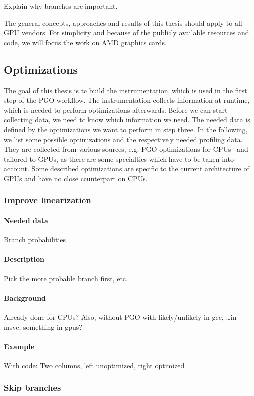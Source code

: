 Explain why branches are important.

The general concepts, approaches and results of this thesis should apply to all GPU vendors. For simplicity and because of the publicly available resources and code, we will focus the work on AMD graphics cards.

\subsection{Optimizations}
The goal of this thesis is to build the instrumentation, which is used in the first step of the PGO workflow. The instrumentation collects information at runtime, which is needed to perform optimizations afterwards. Before we can start collecting data, we need to know which information we need. The needed data is defined by the optimizations we want to perform in step three.
In the following, we list some possible optimizations and the respectively needed profiling data. They are collected from various sources, e.g. PGO optimizations for CPUs~\cite{MicrosoftPgo} and tailored to GPUs, as there are some specialties which have to be taken into account. Some described optimizations are specific to the current architecture of GPUs and have no close counterpart on CPUs.

\subsubsection{Improve linearization}
\paragraph{Needed data} Branch probabilities
\paragraph{Description} Pick the more probable branch first, etc.
\paragraph{Background} Already done for CPUs? Also, without PGO with likely/unlikely in gcc, \dots in msvc, something in gpus?
\paragraph{Example} With code: Two columns, left unoptimized, right optimized

\subsubsection{Skip branches}
